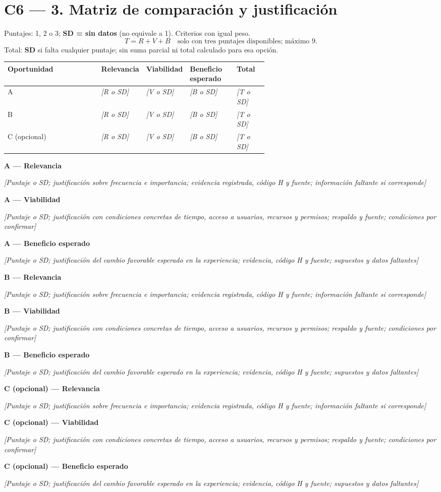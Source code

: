 \documentclass[12pt,a4paper]{article}
\newcommand{\campo}[1]{\textcolor{InstructionColor}{\textit{[#1]}}}
\newcommand{\respuesta}[2]{\par\textbf{#1}\par\campo{#2}\par}
\begin{document}
\section*{C6 --- 3. Matriz de comparación y justificación}
Puntajes: 1, 2 o 3; \textbf{SD = sin datos} (no equivale a 1). Criterios con igual peso.
\[
T=R+V+B\quad\text{solo con tres puntajes disponibles; máximo }9.
\]
Total: \textbf{SD} si falta cualquier puntaje; sin suma parcial ni total calculado para esa opción.
\par{\small
\begin{tabularx}{\linewidth}{|Y|P{0.15\linewidth}|P{0.15\linewidth}|P{0.18\linewidth}|P{0.12\linewidth}|}
\hline
\textbf{Oportunidad} & \textbf{Relevancia} & \textbf{Viabilidad} & \textbf{Beneficio esperado} & \textbf{Total} \\\hline
A & \campo{R o SD} & \campo{V o SD} & \campo{B o SD} & \campo{T o SD} \\\hline
B & \campo{R o SD} & \campo{V o SD} & \campo{B o SD} & \campo{T o SD} \\\hline
C (opcional) & \campo{R o SD} & \campo{V o SD} & \campo{B o SD} & \campo{T o SD} \\\hline
\end{tabularx}\par
}
\newcommand{\justificacion}[1]{%
\respuesta{#1 --- Relevancia}{Puntaje o SD; justificación sobre frecuencia e importancia; evidencia registrada, código H y fuente; información faltante si corresponde}
\respuesta{#1 --- Viabilidad}{Puntaje o SD; justificación con condiciones concretas de tiempo, acceso a usuarios, recursos y permisos; respaldo y fuente; condiciones por confirmar}
\respuesta{#1 --- Beneficio esperado}{Puntaje o SD; justificación del cambio favorable esperado en la experiencia; evidencia, código H y fuente; supuestos y datos faltantes}}
\justificacion{A}
\justificacion{B}
\justificacion{C (opcional)}
\end{document}
